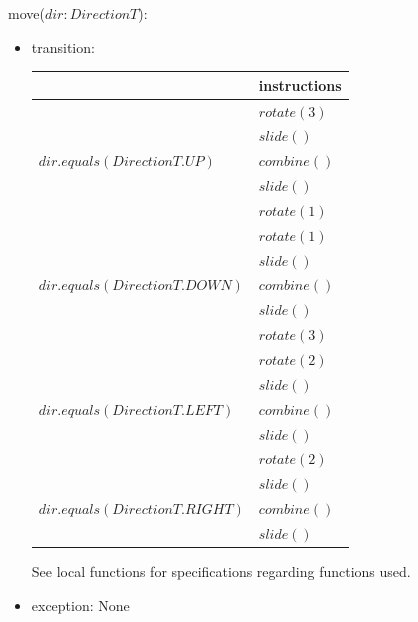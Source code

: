 \documentclass[12pt]{article}
\begin{document}
\noindent move($dir: DirectionT$):
\begin{itemize}
  \item transition: \\
        \begin{tabular}{|l|p{5cm}|}
          \hline
                                                          & instructions \\
          \hline
          \multirow{5}{*}{$dir.equals(DirectionT.UP)$}    & $rotate(3)$  \\
                                                          & $slide()$    \\
                                                          & $combine()$  \\
                                                          & $slide()$    \\
                                                          & $rotate(1)$  \\
          \hline
          \multirow{5}{*}{$dir.equals(DirectionT.DOWN)$}  & $rotate(1)$  \\
                                                          & $slide()$    \\
                                                          & $combine()$  \\
                                                          & $slide()$    \\
                                                          & $rotate(3)$  \\
          \hline
          \multirow{5}{*}{$dir.equals(DirectionT.LEFT)$}  & $rotate(2)$  \\
                                                          & $slide()$    \\
                                                          & $combine()$  \\
                                                          & $slide()$    \\
                                                          & $rotate(2)$  \\
          \hline
          \multirow{3}{*}{$dir.equals(DirectionT.RIGHT)$} & $slide()$    \\
                                                          & $combine()$  \\
                                                          & $slide()$    \\
          \hline
        \end{tabular}

        See local functions for specifications regarding functions used.
  \item exception: None
\end{itemize}
\end{document}
